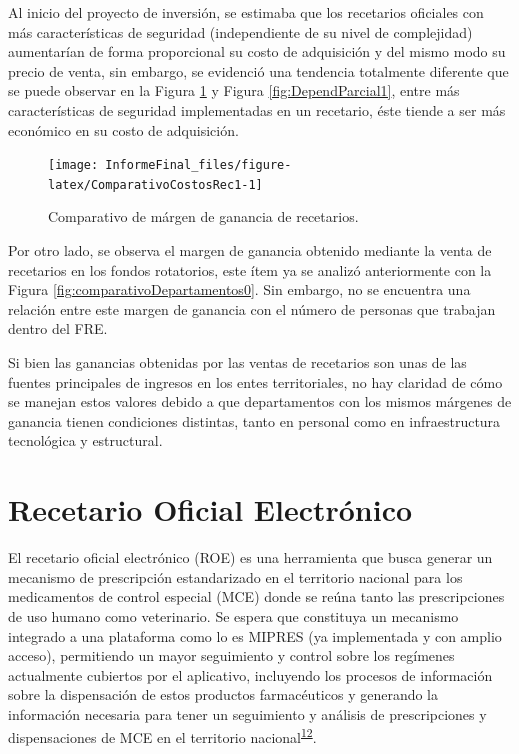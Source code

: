 \documentclass[
]{book}
\begin{document}
Al inicio del proyecto de inversión, se estimaba que los recetarios oficiales con más características de seguridad (independiente de su nivel de complejidad) aumentarían de forma proporcional su costo de adquisición y del mismo modo su precio de venta, sin embargo, se evidenció una tendencia totalmente diferente que se puede observar en la Figura \ref{fig:ComparativoCostosRec1} y Figura \ref{fig:DependParcial1}, entre más características de seguridad implementadas en un recetario, éste tiende a ser más económico en su costo de adquisición.

\begin{figure}

{\centering \texttt{[image: InformeFinal\_files/figure-latex/ComparativoCostosRec1-1]} 

}

\caption{Comparativo de márgen de ganancia de recetarios.}\label{fig:ComparativoCostosRec1}
\end{figure}

Por otro lado, se observa el margen de ganancia obtenido mediante la venta de recetarios en los fondos rotatorios, este ítem ya se analizó anteriormente con la Figura \ref{fig:comparativoDepartamentos0}. Sin embargo, no se encuentra una relación entre este margen de ganancia con el número de personas que trabajan dentro del FRE.

Si bien las ganancias obtenidas por las ventas de recetarios son unas de las fuentes principales de ingresos en los entes territoriales, no hay claridad de cómo se manejan estos valores debido a que departamentos con los mismos márgenes de ganancia tienen condiciones distintas, tanto en personal como en infraestructura tecnológica y estructural.

\hypertarget{recetario-oficial-electruxf3nico}{%
\section{Recetario Oficial Electrónico}\label{recetario-oficial-electruxf3nico}}

El recetario oficial electrónico (ROE) es una herramienta que busca generar un mecanismo de prescripción estandarizado en el territorio nacional para los medicamentos de control especial (MCE) donde se reúna tanto las prescripciones de uso humano como veterinario. Se espera que constituya un mecanismo integrado a una plataforma como lo es MIPRES (ya implementada y con amplio acceso), permitiendo un mayor seguimiento y control sobre los regímenes actualmente cubiertos por el aplicativo, incluyendo los procesos de información sobre la dispensación de estos productos farmacéuticos y generando la información necesaria para tener un seguimiento y análisis de prescripciones y dispensaciones de MCE en el territorio nacional\textsuperscript{\protect\hyperlink{ref-CuervoBustamante2021}{12}}.
\end{document}

